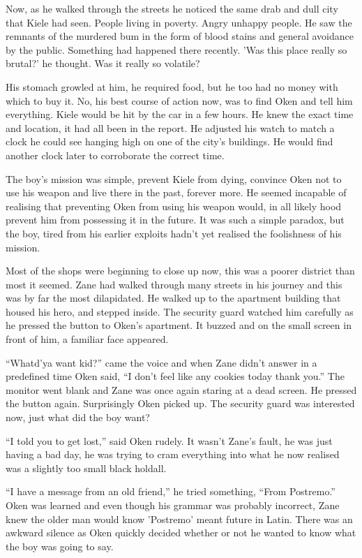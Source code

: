 Now, as he walked through the streets he noticed the same drab and dull city that Kiele had seen.  People living in poverty.  Angry unhappy people.  He saw the remnants of the murdered bum in the form of blood stains and general avoidance by the public.  Something had happened there recently.  'Was this place really so brutal?' he thought.  Was it really so volatile?  

His stomach growled at him, he required food, but he too had no money with which to buy it.  No, his best course of action now, was to find Oken and tell him everything.  Kiele would be hit by the car in a few hours.  He knew the exact time and location, it had all been in the report.  He adjusted his watch to match a clock he could see hanging high on one of the city's buildings.  He would find another clock later to corroborate the correct time.

The boy's mission was simple, prevent Kiele from dying, convince Oken not to use his weapon and live there in the past, forever more.  He seemed incapable of realising that preventing Oken from using his weapon would, in all likely hood prevent him from possessing it in the future.  It was such a simple paradox, but the boy, tired from his earlier exploits hadn't yet realised the foolishness of his mission.

Most of the shops were beginning to close up now, this was a poorer district than most it seemed.  Zane had walked through many streets in his journey and this was by far the most dilapidated.  He walked up to the apartment building that housed his hero, and stepped inside.  The security guard watched him carefully as he pressed the button to Oken's apartment.  It buzzed and on the small screen in front of him, a familiar face appeared.  

``Whatd'ya want kid?'' came the voice and when Zane didn't answer in a predefined time Oken said, ``I don't feel like any cookies today thank you.''  The monitor went blank and Zane was once again staring at a dead screen.  He pressed the button again.  Surprisingly Oken picked up.  The security guard was interested now, just what did the boy want?

``I told you to get lost,'' said Oken rudely.  It wasn't Zane's fault, he was just having a bad day, he was trying to cram everything into what he now realised was a slightly too small black holdall.  

``I have a message from an old friend,'' he tried something, ``From Postremo.''  Oken was learned and even though his grammar was probably incorrect, Zane knew the older man would know 'Postremo' meant future in Latin.  There was an awkward silence as Oken quickly decided whether or not he wanted to know what the boy was going to say. 

